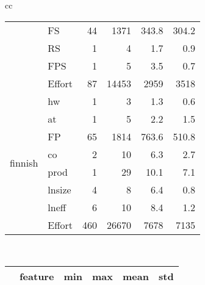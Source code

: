 \begin{table*}[t!]
\begin{tabular}{cc}
\begin{tabular}{|c|l|rrrr|}
& FS & 44 & 1371 & 343.8 & 304.2\\
& RS & 1 & 4 & 1.7 & 0.9\\
& FPS & 1 & 5 & 3.5 & 0.7\\
& Effort & 87 & 14453 & 2959 & 3518\\
\hline
\multirow{8}{*}{\begin{sideways}finnish\end{sideways}}
& hw & 1 & 3 & 1.3 & 0.6\\
& at & 1 & 5 & 2.2 & 1.5\\
& FP & 65 & 1814 & 763.6 & 510.8\\
& co & 2 & 10 & 6.3 & 2.7\\
& prod & 1 & 29 & 10.1 & 7.1\\
& lnsize & 4 & 8 & 6.4 & 0.8\\
& lneff & 6 & 10 & 8.4 & 1.2\\
& Effort & 460 & 26670 & 7678 & 7135\\
\hline

\end{tabular} 



~

\scriptsize
\begin{tabular}{|c|l|rrrr|}
    \hline
      & feature
    & min  & max & mean & std\\
   \hline



\end{tabular}
\end{tabular}
\end{table*}

